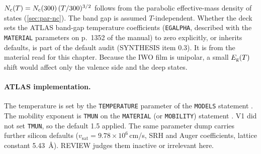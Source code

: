 $N_{\mathrm{c}}(T)=N_{\mathrm{c}}(300)\,(T/300)^{3/2}$ follows from the parabolic effective-mass density of states (\cref{sec:par-nc}). The band gap is assumed $T$-independent. Whether the deck sets the ATLAS band-gap temperature coefficients (\texttt{EGALPHA}, described with the \texttt{MATERIAL} parameters on p.~1352 of the manual) to zero explicitly, or inherits defaults, is part of the default audit (SYNTHESIS item 0.3). It is  from the material read for this chapter. Because the IWO film is unipolar, a small $E_{\mathrm{g}}(T)$ shift would affect only the valence side and the deep states.

\paragraph{ATLAS implementation.}
The temperature is set by the \texttt{TEMPERATURE} parameter of the \texttt{MODELS} statement \citep[p.~1478]{AtlasManual}. The mobility exponent is \texttt{TMUN} on the \texttt{MATERIAL} (or \texttt{MOBILITY}) statement \citep[p.~1355]{AtlasManual}. V1 did not set \texttt{TMUN}, so the default 1.5 applied. The same parameter dump carries further silicon defaults ($v_{\mathrm{sat}}=9.78\times10^{6}$\,cm/s, SRH and Auger coefficients, lattice constant \SI{5.43}{\angstrom}). REVIEW judges them inactive or irrelevant here.

